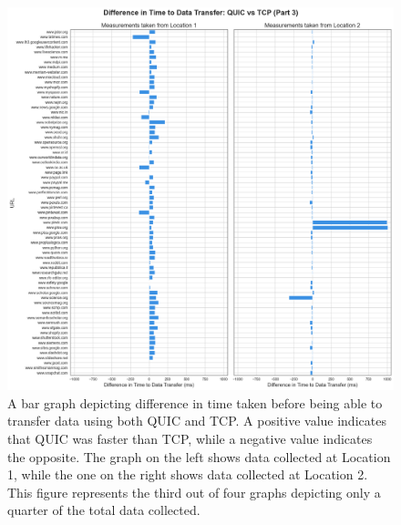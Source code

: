\documentclass{l4proj}
\begin{document}
\begin{appendices}
\begin{figure}
    \centering
    \includegraphics[width=1\linewidth]{images/urlDifference_QUICvsTCP_part3.png}
    \caption{A bar graph depicting difference in time taken before being able to transfer data using both QUIC and TCP. A positive value indicates that QUIC was faster than TCP, while a negative value indicates the opposite. The graph on the left shows data collected at Location 1, while the one on the right shows data collected at Location 2. This figure represents the third out of four graphs depicting only a quarter of the total data collected.}
    \label{fig:urlDifference_p3}
\end{figure}


\end{appendices}
\end{document}
